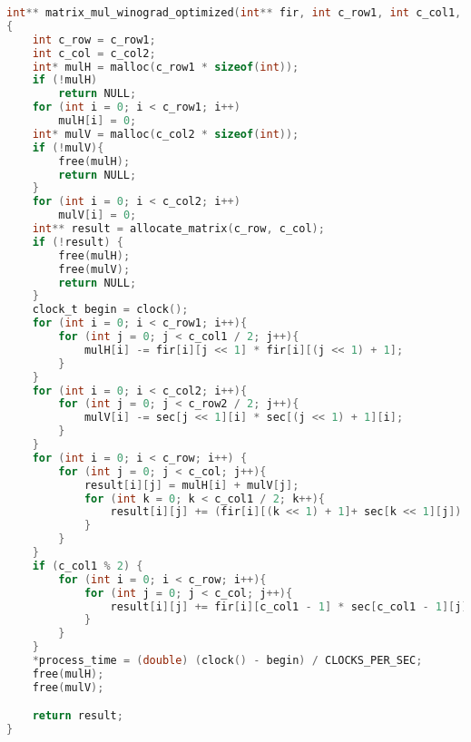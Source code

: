 \documentclass{bmstu}
\begin{document}
\begin{center}
\captionsetup{justification=raggedright,singlelinecheck=off}
\begin{lstlisting}[label=lst:win_opt, language=c, numbers=none, caption=Реализация оптимизированного алгоритма винограда]
int** matrix_mul_winograd_optimized(int** fir, int c_row1, int c_col1, int** sec, int c_row2, int c_col2, double *process_time)
{
    int c_row = c_row1;
    int c_col = c_col2;
    int* mulH = malloc(c_row1 * sizeof(int));
    if (!mulH)
        return NULL;
    for (int i = 0; i < c_row1; i++)
        mulH[i] = 0;
    int* mulV = malloc(c_col2 * sizeof(int));
    if (!mulV){
        free(mulH);
        return NULL;
    }
    for (int i = 0; i < c_col2; i++)
        mulV[i] = 0;
    int** result = allocate_matrix(c_row, c_col);
    if (!result) {
        free(mulH);
        free(mulV);
        return NULL;
    }
    clock_t begin = clock();
    for (int i = 0; i < c_row1; i++){
        for (int j = 0; j < c_col1 / 2; j++){
            mulH[i] -= fir[i][j << 1] * fir[i][(j << 1) + 1];
        }
    }
    for (int i = 0; i < c_col2; i++){
        for (int j = 0; j < c_row2 / 2; j++){
            mulV[i] -= sec[j << 1][i] * sec[(j << 1) + 1][i];
        }
    }
    for (int i = 0; i < c_row; i++) {
        for (int j = 0; j < c_col; j++){
            result[i][j] = mulH[i] + mulV[j];
            for (int k = 0; k < c_col1 / 2; k++){
                result[i][j] += (fir[i][(k << 1) + 1]+ sec[k << 1][j]) * (fir[i][k << 1] + sec[(k << 1) + 1][j]);
            }
        }
    }
    if (c_col1 % 2) {
        for (int i = 0; i < c_row; i++){
            for (int j = 0; j < c_col; j++){
                result[i][j] += fir[i][c_col1 - 1] * sec[c_col1 - 1][j];
            }
        }
    }
    *process_time = (double) (clock() - begin) / CLOCKS_PER_SEC;
    free(mulH);
    free(mulV);

    return result;
}
\end{lstlisting}
\end{center}

\clearpage
\end{document}
